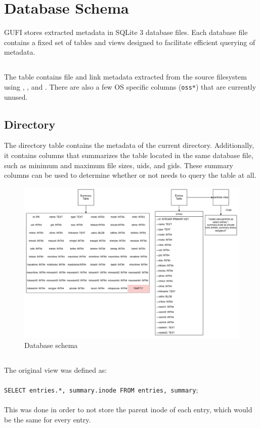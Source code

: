 \section{Database Schema}
\label{sec:schema}
GUFI stores extracted metadata in SQLite 3 database files. Each
database file contains a fixed set of tables and views designed to
facilitate efficient querying of metadata.

\subsection{\entries}
The \entries table contains file and link metadata extracted from the
source filesystem using \stat, \readlink, and \listxattr. There are
also a few OS specific columns (\texttt{oss*}) that are currently
unused.

\subsection{Directory \summary}
The directory \summary table contains the metadata of the current
directory. Additionally, it contains columns that summarizes the
\entries table located in the same database file, such as minimum and
maximum file sizes, uids, and gids. These summary columns can be used
to determine whether or not \querydb needs to query the \entries table
at all.

\begin{figure} [h]
\centering
\includegraphics[width=1.0\textwidth]{images/Database_Schemas.png}
\caption{\label{fig:Database Schema}Database schema}
\end{figure}

\subsection{\pentries}
The original \pentries view was defined as:
\\\\
\texttt{SELECT entries.*, summary.inode FROM entries, summary};
\\\\
This was done in order to not store the parent inode of each entry,
which would be the same for every entry.

